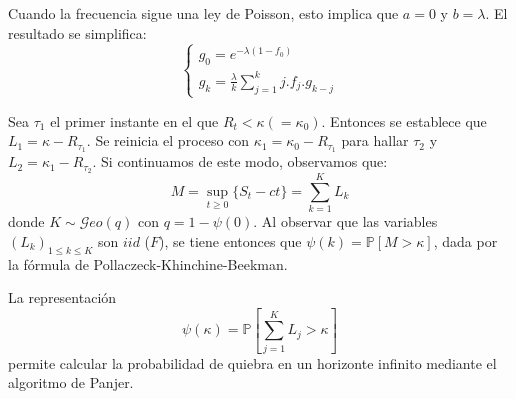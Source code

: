 \begin{f}
	Cuando la frecuencia sigue una ley de Poisson, esto implica que {\color{OrangeProfondIRA} \(a=0\) y \(b=\lambda\).}
	El resultado se simplifica:
	\[
\begin{cases}
		g_0= e^{-\lambda (1-f_0)}
	\\
	g_k=\frac{\lambda}{k}\sum_{j=1}^k j . f_j  . g_{k-j}
\end{cases}	
\]
	
\end{f}

\begin{f}
	
	Sea \(\tau_1\) el primer instante en el que \(R_t<\kappa(=\kappa_0)\). Entonces se establece que \(L_1=\kappa -R_{\tau_1}\).
	Se reinicia el proceso con \(\kappa_1=\kappa_0-R_{\tau_1}\) para hallar \(\tau_2\) y \(L_2=\kappa_1 -R_{\tau_2}\).
	Si continuamos de este modo, observamos que:
	\[
	M=\sup_{t\geq 0}\{ S_t -ct \} =\sum_{k=1}^{K}L_k
	\]
	donde \(K\sim \mathcal{G}eo(q)\) con \(q=1-\psi(0)\).  
	Al observar que las variables \(\left(  L_k\right)_{1\leq k\leq K}\) son \(iid\) (\(F\)), se tiene entonces que \(\psi(k)=\mathbb{P}[M>\kappa]\), dada por la fórmula de Pollaczeck-Khinchine-Beekman.
	
	
	La representación 
	\[
	\psi(\kappa)=\mathbb{P}\left[\sum_{j = 1}^{K}L_j>\kappa \right] 
	\]
	permite calcular la probabilidad de quiebra en un horizonte infinito mediante el algoritmo de Panjer.
		
\end{f}





